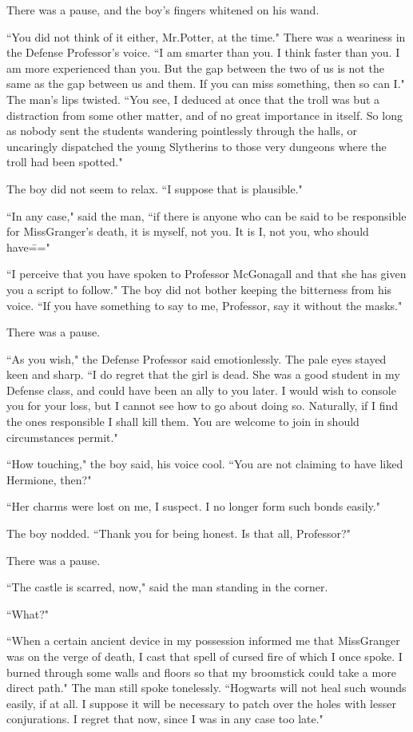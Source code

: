 There was a pause, and the boy's fingers whitened on his wand.

``You did not think of it either, Mr.\?Potter, at the time." There was a weariness in the Defense Professor's voice. ``I am smarter than you. I think faster than you. I am more experienced than you. But the gap between the two of us is not the same as the gap between us and them. If you can miss something, then so can I." The man's lips twisted. ``You see, I deduced at once that the troll was but a distraction from some other matter, and of no great importance in itself. So long as nobody sent the students wandering pointlessly through the halls, or uncaringly dispatched the young Slytherins to those very dungeons where the troll had been spotted."

The boy did not seem to relax. ``I suppose that is plausible."

``In any case," said the man, ``if there is anyone who can be said to be responsible for Miss\?Granger's death, it is myself, not you. It is I, not you, who should have\==="

``I perceive that you have spoken to Professor McGonagall and that she has given you a script to follow." The boy did not bother keeping the bitterness from his voice. ``If you have something to say to me, Professor, say it without the masks."

There was a pause.

``As you wish," the Defense Professor said emotionlessly. The pale eyes stayed keen and sharp. ``I do regret that the girl is dead. She was a good student in my Defense class, and could have been an ally to you later. I would wish to console you for your loss, but I cannot see how to go about doing so. Naturally, if I find the ones responsible I shall kill them. You are welcome to join in should circumstances permit."

``How touching," the boy said, his voice cool. ``You are not claiming to have liked Hermione, then?"

``Her charms were lost on me, I suspect. I no longer form such bonds easily."

The boy nodded. ``Thank you for being honest. Is that all, Professor?"

There was a pause.

``The castle is scarred, now," said the man standing in the corner.

``What?"

``When a certain ancient device in my possession informed me that Miss\?Granger was on the verge of death, I cast that spell of cursed fire of which I once spoke. I burned through some walls and floors so that my broomstick could take a more direct path." The man still spoke tonelessly. ``Hogwarts will not heal such wounds easily, if at all. I suppose it will be necessary to patch over the holes with lesser conjurations. I regret that now, since I was in any case too late."

